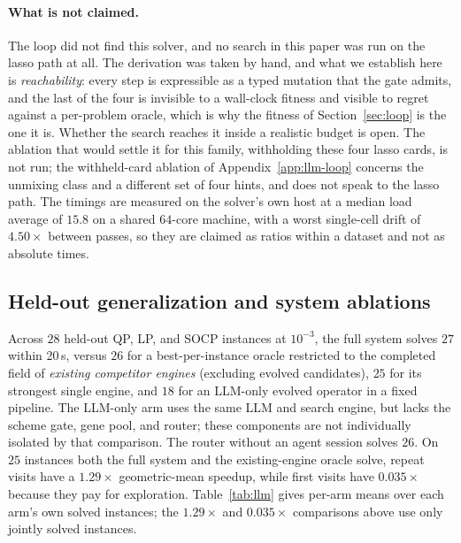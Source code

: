 \paragraph{What is not claimed.} The loop did not find this solver, and no
search in this paper was run on the lasso path at all. The derivation was taken
by hand, and what we establish here is
\emph{reachability}: every step is expressible as a typed mutation that the
gate admits, and the last of the four is invisible to a wall-clock fitness and
visible to regret against a per-problem oracle, which is why the fitness of
Section~\ref{sec:loop} is the one it is. Whether the search reaches it inside
a realistic budget is open. The ablation that would settle it for this
family, withholding these four lasso cards, is not run; the withheld-card
ablation of Appendix~\ref{app:llm-loop} concerns the unmixing class and a
different set of four hints, and does not speak to the lasso path. The timings are measured on
the solver's own host at a median load average of $15.8$ on a shared
$64$-core machine, with a worst single-cell drift of $4.50\times$ between
passes, so they are claimed as ratios within a dataset and not as absolute
times.

\subsection{Held-out generalization and system ablations}
\label{sec:exp:llm}
Across $28$ held-out QP, LP, and SOCP instances at $10^{-3}$, the full system solves $27$ within 20\,s, versus $26$ for a best-per-instance oracle restricted to the completed field of \emph{existing competitor engines} (excluding evolved candidates), $25$ for its strongest single engine, and $18$ for an LLM-only evolved operator in a fixed pipeline. The LLM-only arm uses the same LLM and search engine, but lacks the scheme gate, gene pool, and router; these components are not individually isolated by that comparison. The router without an agent session solves $26$. On $25$ instances both the full system and the existing-engine oracle solve, repeat visits have a $1.29\times$ geometric-mean speedup, while first visits have $0.035\times$ because they pay for exploration. Table~\ref{tab:llm} gives per-arm means over each arm's own solved instances; the $1.29\times$ and $0.035\times$ comparisons above use only jointly solved instances.

